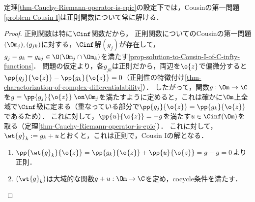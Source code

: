 \documentclass[uplatex, dvipdfmx]{jsreport}
\begin{document}
\begin{lemma}[Cousinの第一問題の定理への還元への成功]
    定理\ref{thm-Cauchy-Riemann-operator-is-epic}の設定下では，Cousinの第一問題\ref{problem-Cousin-I}は正則関数について常に解ける．
\end{lemma}
\begin{proof}
    正則関数は特に$\Cinf$関数だから，
    正則関数についてのCousinの第一問題$(\Om_j),(g_{jk})$に対する，$\Cinf$解$(g_j)$が存在して，$g_j-g_k=g_{kj}\in\O(\Om_j\cap\Om_k)$を満たす\ref{prop-solution-to-Cousin-I-of-C-infty-functions}．
    問題の仮定より，各$g_{jk}$は正則だから，両辺を$\o{z}$で偏微分すると$\pp{g_j}{\o{z}}-\pp{g_k}{\o{z}}=0$（正則性の特徴付け\ref{thm-charactorization-of-complex-differentialability}）．
    したがって，関数$g:\Om\to\C$を$g=\pp{g_j}{\o{z}}\;\on\Om_j$を満たすように定めると，これは確かに$\Om$上全域で$\Cinf$級に定まる（重なっている部分で$\pp{g_j}{\o{z}}=\pp{g_k}{\o{z}}$であるため）．
    これに対して，$\pp{u}{\o{z}}=-g$を満たす$u\in\Cinf(\Om)$を取る（定理\ref{thm-Cauchy-Riemann-operator-is-epic}）．
    これに対して，$\wt{g}_k:=g_k+u$とおくと，これは正則で，Cousin Iの解となる．
    \begin{enumerate}
        \item $\pp{\wt{g}_k}{\o{z}}=\pp{g_k}{\o{z}}+\pp{u}{\o{z}}=g-g=0$より正則．
        \item $(\wt{g}_k)$は大域的な関数$g+u:\Om\to\C$を定め，cocycle条件を満たす．
    \end{enumerate}
\end{proof}
\end{document}
